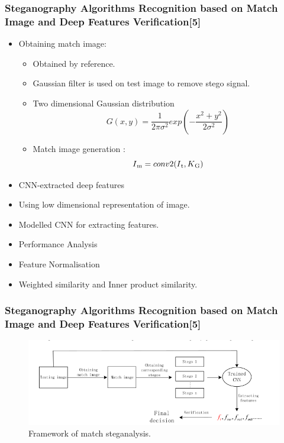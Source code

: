 \documentclass{beamer} %
\theoremstyle{definition} %
\begin{document}
\begin{frame}
\frametitle{Steganography Algorithms Recognition based on Match Image and Deep Features Verification[5] }
\begin{itemize}
\item Obtaining	match image: 
\begin{itemize}
\item Obtained by reference.
\item Gaussian filter is used on test image to remove stego signal.
\item Two dimensional Gaussian distribution
\begin{equation}
G(x,y) = \frac{1}{2\pi\sigma^2} exp(-\frac{x^2+y^2}{2\sigma^2})
\end{equation}
\item Match image generation :
\begin{equation}
I\textsubscript{m}=conv2(I\textsubscript{t},K\textsubscript{G})
\end{equation}
\end{itemize}
\item CNN-extracted deep features
\item Using low dimensional representation of image.
\item Modelled CNN for extracting features.
\item Performance Analysis
\item Feature Normalisation
\item Weighted  similarity and Inner product similarity.
\end{itemize}
\end{frame}

\begin{frame}
\frametitle{Steganography Algorithms Recognition based on Match Image and Deep Features Verification[5] }
\begin{figure}
\includegraphics[scale=0.47]{matchstegFramework.png}
\caption{Framework of match steganalysis.}
\end{figure}
\end{frame}
\end{document}
